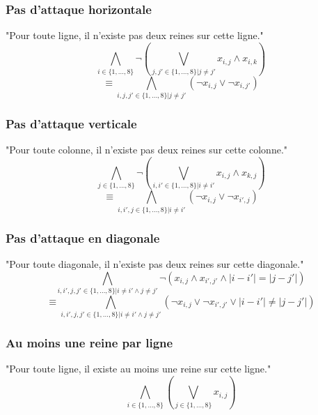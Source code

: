 \subsubsection*{Pas d'attaque horizontale}
"Pour toute ligne, il n'existe pas deux reines sur cette ligne."
\begin{equation*}
    \bigwedge_{i \in \{1,\dots,8\}} \neg (\bigvee_{j,j' \in \{1,\dots,8\} | j \neq j'} x_{i,j} \wedge x_{i,k})
\end{equation*}
\begin{equation*}
    \equiv \bigwedge_{i,j,j' \in \{1,\dots,8\} | j \neq j'} (\neg x_{i,j} \vee \neg x_{i,j'})
\end{equation*}
\subsubsection*{Pas d'attaque verticale}
"Pour toute colonne, il n'existe pas deux reines sur cette colonne."
\begin{equation*}
    \bigwedge_{j \in \{1,\dots,8\}} \neg (\bigvee_{i,i' \in \{1,\dots,8\} | i \neq i'} x_{i,j} \wedge x_{k,j})
\end{equation*}
\begin{equation*}
    \equiv \bigwedge_{i,i',j \in \{1,\dots,8\} | i \neq i'} (\neg x_{i,j} \vee \neg x_{i',j})
\end{equation*}
\subsubsection*{Pas d'attaque en diagonale}
"Pour toute diagonale, il n'existe pas deux reines sur cette diagonale."
\begin{equation*}
    \bigwedge_{i,i',j,j' \in \{1,\dots,8\} | i \neq i' \wedge j \neq j'} \neg (x_{i,j} \wedge x_{i',j'} \wedge |i-i'| = |j-j'|)
\end{equation*}
\begin{equation*}
    \equiv \bigwedge_{i,i',j,j' \in \{1,\dots,8\} | i \neq i' \wedge j \neq j'} (\neg x_{i,j} \vee \neg x_{i',j'} \vee |i-i'| \neq |j-j'|)
\end{equation*}
\subsubsection*{Au moins une reine par ligne}
"Pour toute ligne, il existe au moins une reine sur cette ligne."
\begin{equation*}
    \bigwedge_{i \in \{1,\dots,8\}} (\bigvee_{j \in \{1,\dots,8\}} x_{i,j})
\end{equation*}

